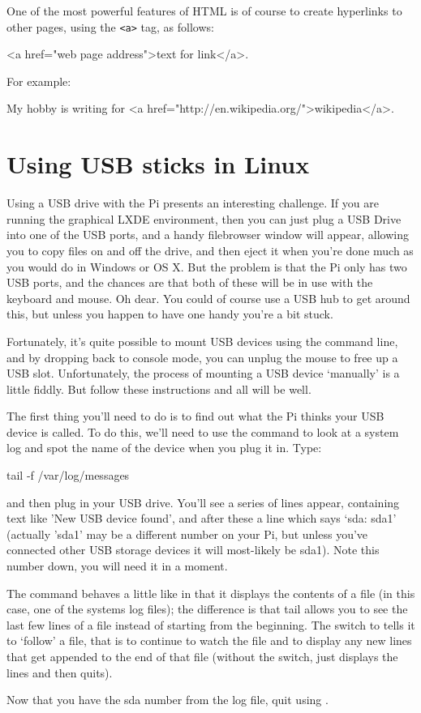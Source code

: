 One of the most powerful features of HTML is of course to create hyperlinks to
other pages, using the \verb|<a>| tag, as follows:

\begin{ttoutenv}
<a href="web page address">text for link</a>.
\end{ttoutenv}

For example:

\begin{ttoutenv}
My hobby is writing for <a href="http://en.wikipedia.org/">wikipedia</a>.
\end{ttoutenv}

\section{Using USB sticks in Linux}
\label{appendix:usingUSB}

Using a USB drive with the Pi presents an interesting challenge. If you are running the graphical LXDE environment, then you can just plug a USB Drive into one of the USB ports, and a handy filebrowser window will appear, allowing you to copy files on and off the drive, and then eject it when you're done much as you would do in Windows or OS X. But the problem is that the Pi only has two USB ports, and the chances are that both of these will be in use with the keyboard and mouse. Oh dear. You could of course use a USB hub to get around this, but unless you happen to have one handy you're a bit stuck.

Fortunately, it's quite possible to mount USB devices using the command line, and by dropping back to console mode, you can unplug the mouse to free up a USB slot. Unfortunately, the process of mounting a USB device `manually' is a little fiddly. But follow these instructions and all will be well.

The first thing you'll need to do is to find out what the Pi thinks your USB device is called. To do this, we'll need to use the  command to look at a system log and spot the name of the device when you plug it in. Type:

\begin{ttoutenv}
tail -f /var/log/messages
\end{ttoutenv}

and then plug in your USB drive. You'll see a series of lines appear, containing text like 'New USB device found', and after these a line which says `sda: sda1' (actually 'sda1' may be a different number on your Pi, but unless you've connected other USB storage devices it will most-likely be sda1). Note this number down, you will need it in a moment.

The  command behaves a little like  in that it displays the contents of a file (in this case, one of the systems log files); the difference is that tail allows you to see the last few lines of a file instead of starting from the beginning. The  switch to  tells it to `follow' a file, that is to continue to watch the file and to display any new lines that get appended to the end of that file (without the switch,  just displays the lines and then quits).

Now that you have the sda number from the log file, quit  using .
